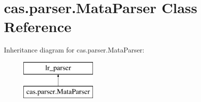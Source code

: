 \hypertarget{classcas_1_1parser_1_1_mata_parser}{\section{cas.\-parser.\-Mata\-Parser Class Reference}
\label{classcas_1_1parser_1_1_mata_parser}
}
Inheritance diagram for cas.\-parser.\-Mata\-Parser\-:\begin{figure}[H]
\begin{center}
\leavevmode
\includegraphics[height=2.000000cm]{classcas_1_1parser_1_1_mata_parser}
\end{center}
\end{figure}
